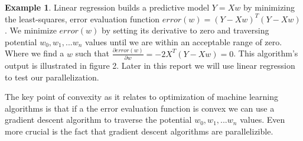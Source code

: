 \documentclass{article}
\theoremstyle{definition}
\newtheorem{example}{Example}[section]
\begin{document}
\begin{example}
    Linear regression builds a predictive model $Y = Xw$ by minimizing the least-squares, error evaluation function $error(w) = (Y - Xw)^T(Y - Xw)$. We minimize $error(w)$ by setting its derivative to zero and traversing potential $w_0, w_1, ... w_n$ values until we are within an acceptable range of zero. Where we find a $w$ such that $\frac{\partial error(w)}{\partial w} = -2X^T(Y - Xw) = 0$. This algorithm's output is illustrated in figure 2. Later in this report we will use linear regression to test our parallelization.
\end{example}

The key point of convexity as it relates to optimization of machine learning algorithms is that if a the error evaluation function is convex we can use a gradient descent algorithm to traverse the potential $w_0, w_1, ... w_n$ values. Even more crucial is the fact that gradient descent algorithms are parallelizible.
\end{document}
